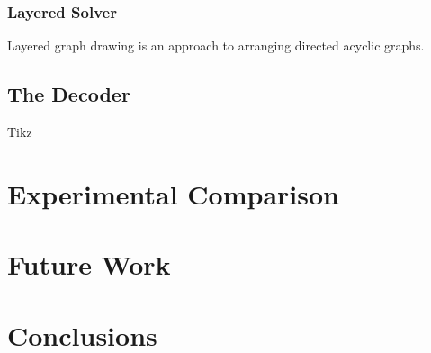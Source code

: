 \documentclass{article}
\begin{document}
\subsubsection{Layered Solver}
Layered graph drawing is an approach to arranging directed acyclic graphs.


\subsection{The Decoder}
Tikz


\section{Experimental Comparison}


\section{Future Work}


\section{Conclusions}



\end{document}
